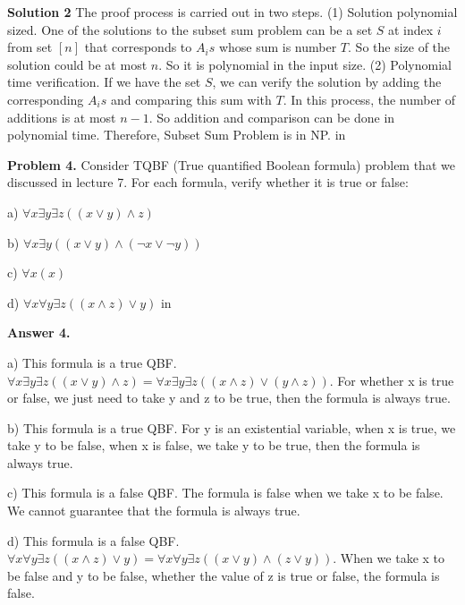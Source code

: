 \documentclass[11pt]{article}
\begin{document}
\textbf{Solution 2} The proof process is carried out in two steps. (1) Solution polynomial sized. One of the solutions to the subset sum problem can be a set $S$ at index $i$ from set $[n]$ that corresponds to $A_is$ whose sum is number $T$. So the size of the solution could be at most $n$. So it is polynomial in the input size. (2) Polynomial time verification. If we have the set $S$, we can verify the solution by adding the corresponding $A_is$ and comparing this sum with $T$. In this process, the number of additions is at most $n-1$. So addition and comparison can be done in polynomial time. Therefore, Subset Sum Problem is in NP.
 in

\newpage
{\bf Problem 4.} Consider TQBF (True quantified Boolean formula) problem that we discussed in lecture 7. For each formula, verify whether it is true or false:

a) $\forall x \exists y \exists z((x\vee y)\wedge z)$

b) $\forall x \exists y ((x\vee y)\wedge (\neg x \vee \neg y))$

c) $\forall x (x)$

d) $\forall x \forall y \exists z((x\wedge z)\vee y)$
 in

{\bf Answer 4.} 

a) This formula is a true QBF. $\forall x \exists y \exists z((x\vee y)\wedge z)=\forall x \exists y \exists z((x\wedge z)\vee(y\wedge z))$. For whether x is true or false, we just need to take y and z to be true, then the formula is always true.

b) This formula is a true QBF. For y is an existential variable, when x is true, we take y to be false, when x is false, we take y to be true, then the formula is always true.

c) This formula is a false QBF. The formula is false when we take x to be false. We cannot guarantee that the formula is always true.

d) This formula is a false QBF. $\forall x \forall y \exists z((x\wedge z)\vee y)=\forall x \forall y \exists z((x\vee y)\wedge(z\vee y))$. When we take x to be false and y to be false, whether the value of z is true or false, the formula is false.
\end{document}
